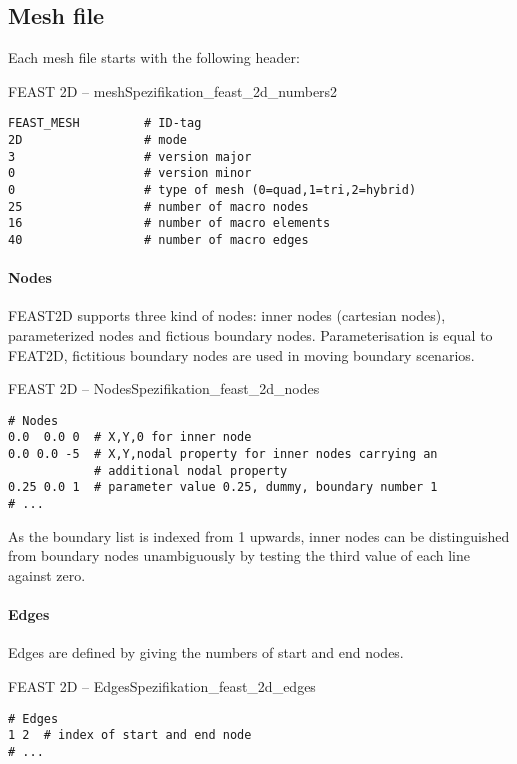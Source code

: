 
\subsection*{Mesh file}

Each mesh file starts with the following header:

\begin{code}{FEAST 2D -- mesh}{Spezifikation_feast_2d_numbers2}
\begin{verbatim}
FEAST_MESH         # ID-tag
2D                 # mode
3                  # version major
0                  # version minor
0                  # type of mesh (0=quad,1=tri,2=hybrid)
25                 # number of macro nodes
16                 # number of macro elements
40                 # number of macro edges
\end{verbatim}
\end{code}

\paragraph{Nodes} FEAST2D supports three kind of nodes: inner nodes (cartesian nodes), 
parameterized nodes and fictious boundary nodes. Parameterisation is equal to FEAT2D, fictitious 
boundary nodes are used in moving boundary scenarios.

\begin{code}{FEAST 2D -- Nodes}{Spezifikation_feast_2d_nodes}
\begin{verbatim}
# Nodes
0.0  0.0 0  # X,Y,0 for inner node
0.0 0.0 -5  # X,Y,nodal property for inner nodes carrying an 
            # additional nodal property
0.25 0.0 1  # parameter value 0.25, dummy, boundary number 1
# ...
\end{verbatim}
\end{code}
As the boundary list is indexed from 1 upwards, inner nodes can be distinguished from boundary 
nodes unambiguously by testing the third value of each line against zero. 
\paragraph{Edges}

Edges are defined by giving the numbers of start and end nodes.

\begin{code}{FEAST 2D -- Edges}{Spezifikation_feast_2d_edges}
\begin{verbatim}
# Edges
1 2  # index of start and end node
# ...
\end{verbatim}
\end{code}

